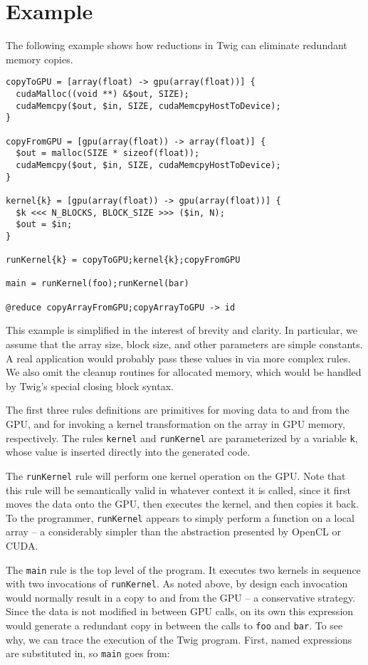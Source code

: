 
\section{Example}

The following example shows how reductions in Twig can eliminate redundant
memory copies.

\begin{verbatim}
copyToGPU = [array(float) -> gpu(array(float))] {
  cudaMalloc((void **) &$out, SIZE);
  cudaMemcpy($out, $in, SIZE, cudaMemcpyHostToDevice);
}

copyFromGPU = [gpu(array(float)) -> array(float)] {
  $out = malloc(SIZE * sizeof(float));
  cudaMemcpy($out, $in, SIZE, cudaMemcpyHostToDevice);
}

kernel{k} = [gpu(array(float)) -> gpu(array(float))] {
  $k <<< N_BLOCKS, BLOCK_SIZE >>> ($in, N);
  $out = $in;
}

runKernel{k} = copyToGPU;kernel{k};copyFromGPU

main = runKernel(foo);runKernel(bar)

@reduce copyArrayFromGPU;copyArrayToGPU -> id
\end{verbatim}

This example is simplified in the interest of brevity and clarity. In
particular, we assume that the array size, block size, and other parameters are
simple constants. A real application would probably pass these values in via
more complex rules. We also omit the cleanup routines for allocated memory,
which would be handled by Twig's special closing block syntax.

The first three rules definitions are primitives for moving data to and from the
GPU, and for invoking a kernel transformation on the array in GPU memory,
respectively. The rules \texttt{kernel} and \texttt{runKernel} are parameterized
by a variable \texttt{k}, whose value is inserted directly into the generated
code.

The \texttt{runKernel} rule will perform one kernel operation on the GPU. Note
that this rule will be semantically valid in whatever context it is called,
since it first moves the data onto the GPU, then executes the kernel, and then
copies it back. To the programmer, \texttt{runKernel} appears to simply perform
a function on a local array -- a considerably simpler than the abstraction
presented by OpenCL or CUDA.

The \texttt{main} rule is the top level of the program. It executes two kernels
in sequence with two invocations of \texttt{runKernel}. As noted above, by
design each invocation would normally result in a copy to and from the GPU -- a
conservative strategy. Since the data is not modified in between GPU calls, on
its own this expression would generate a redundant copy in between the calls to
\texttt{foo} and \texttt{bar}. To see why, we can trace the execution of the
Twig program. First, named expressions are substituted in, so \texttt{main}
goes from:

